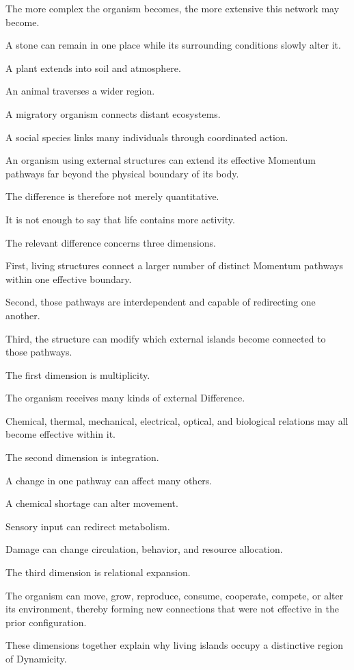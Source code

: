 The more complex the organism becomes, the more extensive this network may become.

A stone can remain in one place while its surrounding conditions slowly alter it.

A plant extends into soil and atmosphere.

An animal traverses a wider region.

A migratory organism connects distant ecosystems.

A social species links many individuals through coordinated action.

An organism using external structures can extend its effective Momentum pathways far beyond the physical boundary of its body.

The difference is therefore not merely quantitative.

It is not enough to say that life contains more activity.

The relevant difference concerns three dimensions.

First, living structures connect a larger number of distinct Momentum pathways within one effective boundary.

Second, those pathways are interdependent and capable of redirecting one another.

Third, the structure can modify which external islands become connected to those pathways.

The first dimension is multiplicity.

The organism receives many kinds of external Difference.

Chemical, thermal, mechanical, electrical, optical, and biological relations may all become effective within it.

The second dimension is integration.

A change in one pathway can affect many others.

A chemical shortage can alter movement.

Sensory input can redirect metabolism.

Damage can change circulation, behavior, and resource allocation.

The third dimension is relational expansion.

The organism can move, grow, reproduce, consume, cooperate, compete, or alter its environment, thereby forming new connections that were not effective in the prior configuration.

These dimensions together explain why living islands occupy a distinctive region of Dynamicity.

